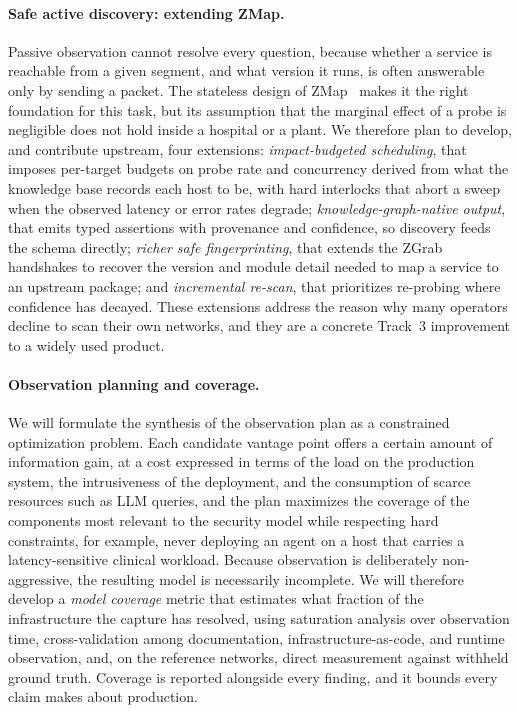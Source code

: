 \paragraph{Safe active discovery: extending ZMap.}
Passive observation cannot resolve every question, because whether a service
is reachable from a given segment, and what version it runs, is often
answerable only by sending a packet. The stateless design of ZMap~\cite{zmap} makes it
the right foundation for this task, but its assumption that the marginal
effect of a probe is negligible does not hold inside a hospital or a plant.
We therefore plan to develop, and contribute upstream, four extensions:
\emph{impact-budgeted scheduling}, that imposes per-target budgets on probe
rate and concurrency derived from what the knowledge base records each host
to be, with hard interlocks that abort a sweep when the observed latency or
error rates degrade; \emph{knowledge-graph-native output}, that emits typed assertions with provenance and confidence, so discovery feeds
the schema directly; \emph{richer safe fingerprinting}, that extends the
ZGrab~\cite{zgrab} handshakes to recover the version and module detail needed
to map a service to an upstream package; and \emph{incremental re-scan},
that prioritizes re-probing where confidence has decayed. These extensions
address the reason why many operators decline to scan their own networks, and
they are a concrete Track~3 improvement to a widely used product.

\paragraph{Observation planning and coverage.}
We will formulate the synthesis of the observation plan as a constrained
optimization problem. Each candidate vantage point offers a certain amount of
information gain, at a cost expressed in terms of the load on the production
system, the intrusiveness of the deployment, and the consumption of scarce
resources such as LLM queries, and the plan maximizes the coverage of the
components most relevant to the security model while respecting hard
constraints, for example, never deploying an agent on a host that carries a
latency-sensitive clinical workload. Because observation is deliberately
non-aggressive, the resulting model is necessarily incomplete. We will therefore develop a
\emph{model coverage} metric that estimates what fraction of the infrastructure the capture has
resolved, using saturation analysis over observation time, cross-validation
among documentation, infrastructure-as-code, and runtime observation, and, on
the reference networks, direct measurement against withheld ground truth.
Coverage is reported alongside every finding, and it bounds every claim
\sysname makes about production.

